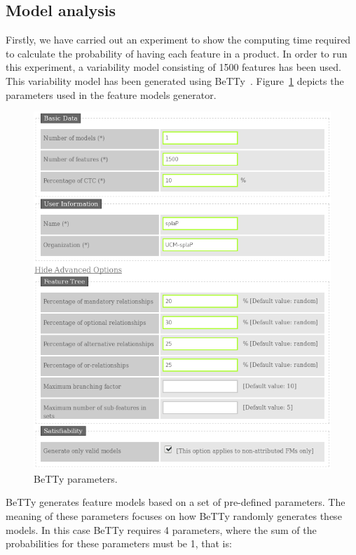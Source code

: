 
\subsection{Model analysis}
\label{sec:stat:impl:model:analysis}

Firstly, we have carried out an experiment to
show the computing time required to calculate the probability of having
each feature in a product. In order to run this experiment, a variability model consisting of
1500 features has been used.
This variability model
has been generated using BeTTy~\cite{SeguraHBC11}.
Figure~\ref{fig:plot:betty:params} depicts the parameters used in the feature models
generator.

\begin{figure}[h]
	\centering
	\linefigure
	\includegraphics[width=0.8\hsize,angle=0]{BeTTy_website.png}
	\linefigure
	\caption{BeTTy parameters.}\label{fig:plot:betty:params}
\end{figure}


BeTTy generates feature models based on a set of pre-defined parameters.
The meaning of these parameters focuses on how 
BeTTy randomly generates these models.
In this case BeTTy requires 4 parameters, where the sum of the probabilities 
for these parameters must be 1, that is:

